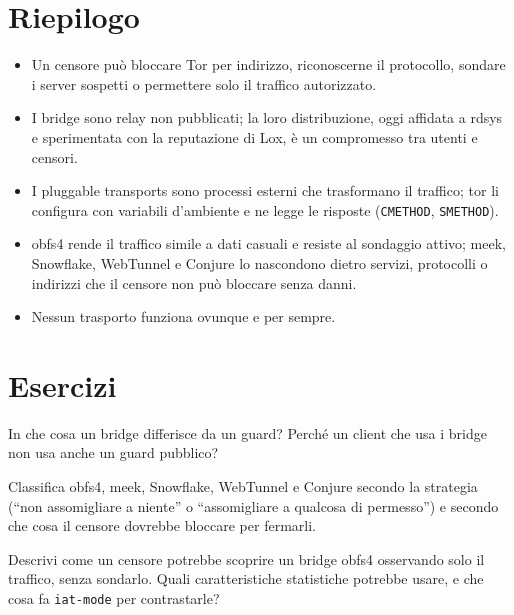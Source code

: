 \section*{Riepilogo}
\begin{itemize}
  \item Un censore può bloccare Tor per indirizzo, riconoscerne il protocollo, sondare i server sospetti o permettere solo il traffico autorizzato.
  \item I bridge sono relay non pubblicati; la loro distribuzione, oggi affidata a rdsys e sperimentata con la reputazione di Lox, è un compromesso tra utenti e censori.
  \item I pluggable transports sono processi esterni che trasformano il traffico; tor li configura con variabili d'ambiente e ne legge le risposte (\texttt{CMETHOD}, \texttt{SMETHOD}).
  \item obfs4 rende il traffico simile a dati casuali e resiste al sondaggio attivo; meek, Snowflake, WebTunnel e Conjure lo nascondono dietro servizi, protocolli o indirizzi che il censore non può bloccare senza danni.
  \item Nessun trasporto funziona ovunque e per sempre.
\end{itemize}

\section*{Esercizi}

\begin{esercizio}[1]\label{es:16-guard}
In che cosa un bridge differisce da un guard? Perché un client che usa i bridge non usa anche un guard pubblico?
\end{esercizio}

\begin{esercizio}[1]\label{es:16-strategie}
Classifica obfs4, meek, Snowflake, WebTunnel e Conjure secondo la strategia (\enquote{non assomigliare a niente} o \enquote{assomigliare a qualcosa di permesso}) e secondo che cosa il censore dovrebbe bloccare per fermarli.
\end{esercizio}

\begin{esercizio}[2]\label{es:16-sondaggio}
Descrivi come un censore potrebbe scoprire un bridge obfs4 osservando solo il traffico, senza sondarlo. Quali caratteristiche statistiche potrebbe usare, e che cosa fa \texttt{iat-mode} per contrastarle?
\end{esercizio}

